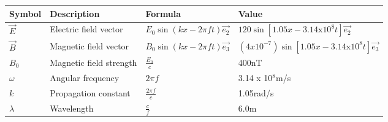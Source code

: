 \setlength{\arrayrulewidth}{0.3mm}
\setlength{\tabcolsep}{15pt}
\renewcommand{\arraystretch}{1.6}

\begin{center}
\begin{tabular}{ |p{0.7cm}|p{1.5cm}|p{2.7cm}|p{2.7cm}|  }
\hline

Symbol& Description&Formula&Value\\
\hline
$\vec{E}$ & Electric field vector & $E_0\sin(kx - 2\pi f t)\vec{e_2}$ & $120\sin[1.05x - 3.14 \text{x} 10^8t]\vec{e_2}$\\
\hline
$\vec{B}$ & Magnetic field vector & $B_0\sin(kx - 2 \pi f t)\vec{e_3}$ & $(4 x 10^{-7})\sin[1.05x - 3.14 \text{x} 10^8t]\vec{e_3}$\\
\hline
$B_0$ & Magnetic field strength & $\frac{E_0}{c}$ & 400nT\\
\hline
$\omega$ & Angular frequency & $2\pi f$ & 3.14 x 10$^8$m/s\\
\hline
$k$ &Propagation constant & $\frac{2\pi f}{c}$ & 1.05rad/s\\
\hline
$\lambda$ & Wavelength & $\frac{c}{f}$ & 6.0m\\
\hline

\end{tabular}
\end{center}
